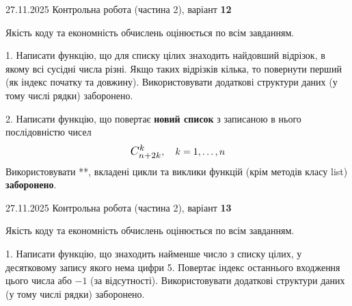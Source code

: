 \documentclass[11pt, ukrainian]{article}
\begin{document}
{{{{{{{{{{{\begin {large}
\end{large}
\newpage
{{27.11.2025 Контрольна робота  (частина 2), варіант  \No \textbf { 12 }\par}}


{
\begin {large}
Якість коду та економність обчислень оцінюється по всім завданням.


1. Написати функцію, що для списку цілих знаходить найдовший відрізок, в якому всі сусідні числа різні. Якщо таких відрізків кілька, то повернути перший (як індекс початку та довжину). Використовувати додаткові структури даних (у тому числі рядки) заборонено.


2. 
Написати функцію, що повертає \textbf{новий список} з записаною в нього послідовністю чисел
$$\scalebox{1.2}{$C_{n+2k}^{k}$}, \quad k=1,\ldots,n$$
Використовувати **, вкладені цикли та виклики функцій (крім методів класу list) \textbf{заборонено}.

\end{large}
\newpage
{{27.11.2025 Контрольна робота  (частина 2), варіант  \No \textbf { 13 }\par}}


{
\begin {large}
Якість коду та економність обчислень оцінюється по всім завданням.


1. Написати функцію, що знаходить найменше число з списку цілих, у десятковому запису якого нема цифри 5. Повертає індекс останнього входження цього числа або $-1$ (за відсутності). Використовувати додаткові структури даних (у тому числі рядки) заборонено.


\end{large}}}}}}}}}}}}}}
\end{document}
